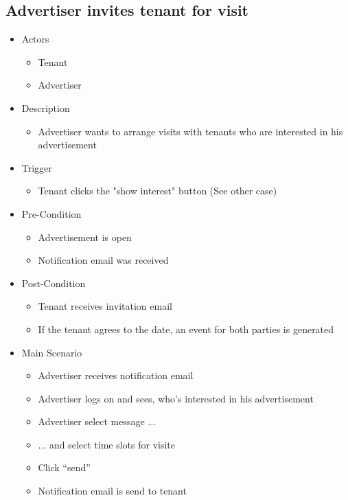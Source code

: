 \documentclass[a4paper,11pt]{article}
\begin{document}
\subsection*{Advertiser invites tenant for visit}
\begin{itemize}
  \item Actors
    \begin{itemize}
      \item Tenant
      \item Advertiser
    \end{itemize}
  \item Description
    \begin{itemize}
      \item Advertiser wants to arrange visits with tenants who are interested in his advertisement
    \end{itemize}
  \item Trigger
    \begin{itemize}
      \item Tenant clicks the "show interest" button (See other case)
    \end{itemize}
  \item Pre-Condition
    \begin{itemize}
      \item Advertisement is open
      \item Notification email was received 
    \end{itemize}
  \item Post-Condition
    \begin{itemize}
      \item Tenant receives invitation email
      \item If the tenant agrees to the date, an event for both parties is generated
    \end{itemize}
  \item Main Scenario
    \begin{itemize}
      \item Advertiser receives notification email
      \item Advertiser logs on and sees, who's interested in his advertisement
      \item Advertiser select message ...
      \item ... and select time slots for visite
      \item Click “send”
      \item Notification email is send to tenant 
    \end{itemize}
  \end{itemize}
\end{document}
